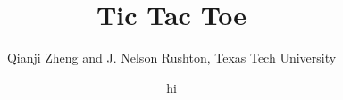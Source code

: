 \documentclass{led_doc}
\begin{document}
\begin{ledCmnt}
\title{Tic Tac Toe}
\date{hi}
\author{Qianji Zheng and J. Nelson Rushton, Texas Tech University}
\maketitle
\end{ledCmnt}

\hrulefill
\end{document}
